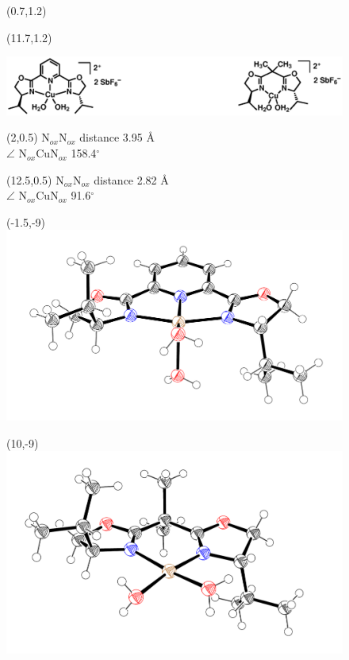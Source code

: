 \begin{figure}[t]
\vspace{1.65in}
  \centering
     \begin{textblock}{1}(0.7,1.2)  \end{textblock}
   \begin{textblock}{1}(11.7,1.2)  \end{textblock}
  \includegraphics[scale=0.8]{chp_asymmetric/images/evanscopper}
  \begin{textblock}{5}(2,0.5) \small \textsf{N$_{ox}$\ce{-}N$_{ox}$ distance 3.95
  \AA \\ $\angle$ N$_{ox}$\ce{-}Cu\ce{-}N$_{ox}$ 158.4$^\circ$}\end{textblock}
  \begin{textblock}{5}(12.5,0.5) \small \textsf{N$_{ox}$\ce{-}N$_{ox}$ distance 2.82
  \AA \\ $\angle$ N$_{ox}$\ce{-}Cu\ce{-}N$_{ox}$ 91.6$^\circ$}\end{textblock} 
  \begin{textblock}{1}(-1.5,-9)
  \includegraphics[scale=0.3]{chp_asymmetric/images/copperpyboxortep}\end{textblock}
  \begin{textblock}{1}(10,-9)
  \includegraphics[scale=0.3]{chp_asymmetric/images/copperboxortep}\end{textblock}

\end{figure}
